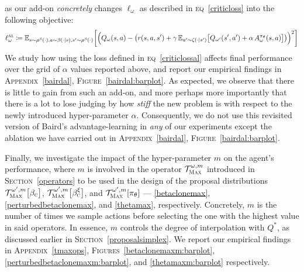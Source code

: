 as our add-on \emph{concretely} changes $\ell_\omega$ as described in \textsc{eq}~\ref{criticloss} into
the following objective:
\begin{align}
  \ell^\textsc{al}_\omega \coloneqq
  \mathbb{E}_{s \sim \rho^\beta(\cdot), a \sim \beta(\cdot | s), s' \sim \rho^\beta(\cdot)}
  \bigg[
  \Big(
  Q_\omega(s,a) -
  \big(
  r(s, a, s') + \gamma \, \mathbb{E}_{a' \sim \zeta(\cdot | s')}
  \big[
  Q_{\omega'}(s',a') + \alpha \, A^{\pi_\theta}_\omega(s,a)
  \big]
  \big)
  \Big)^2
  \bigg]
  \label{criticlossal}
\end{align}
We study how using the loss defined in \textsc{eq}~\ref{criticlossal}
affects final performance over the grid of $\alpha$ values reported above,
and report our empirical findings in \textsc{Appendix}~\ref{bairdal}, \textsc{Figure}~\ref{bairdal:barplot}.
As expected, we observe that there is little to gain from such an add-on, and more perhaps more importantly
that there is a lot to lose judging by how \emph{stiff} the new problem is
with respect to the newly introduced hyper-parameter $\alpha$. Consequently, we do not use
this revisited version of Baird's advantage-learning in \emph{any} of our experiments
except the ablation we have carried out in \textsc{Appendix}~\ref{bairdal}, \textsc{Figure}~\ref{bairdal:barplot}.

Finally, we investigate the impact of the hyper-parameter $m$ on the agent's performance,
where $m$ is involved in the operator $\mathcal{T}_\textsc{Max}^{\omega, m}$ introduced in
\textsc{Section}~\ref{operators} to be used in the design of the proposal distributions
$\mathcal{T}_\textsc{Max}^{\omega', m}\big[\beta_\textsc{c}\big]$,
$\mathcal{T}_\textsc{Max}^{\omega', m}\big[\beta_\textsc{c}^\xi\big]$, and
$\mathcal{T}_\textsc{Max}^{\omega', m}[\pi_\theta]$
--- \ref{betaclonemax}, \ref{perturbedbetaclonemax}, and \ref{thetamax}, respectively.
Concretely, $m$ is the number of times we sample actions before selecting the one with the highest value
in said operators.
In essence, $m$ controls the degree of interpolation with $Q^*$, as discussed earlier in
\textsc{Section}~\ref{proposalsimplex}.
We report our empirical findings in \textsc{Appendix}~\ref{tmaxops},
\textsc{Figures}~\ref{betaclonemaxm:barplot}, \ref{perturbedbetaclonemaxm:barplot}, and
\ref{thetamaxm:barplot} respectively.


